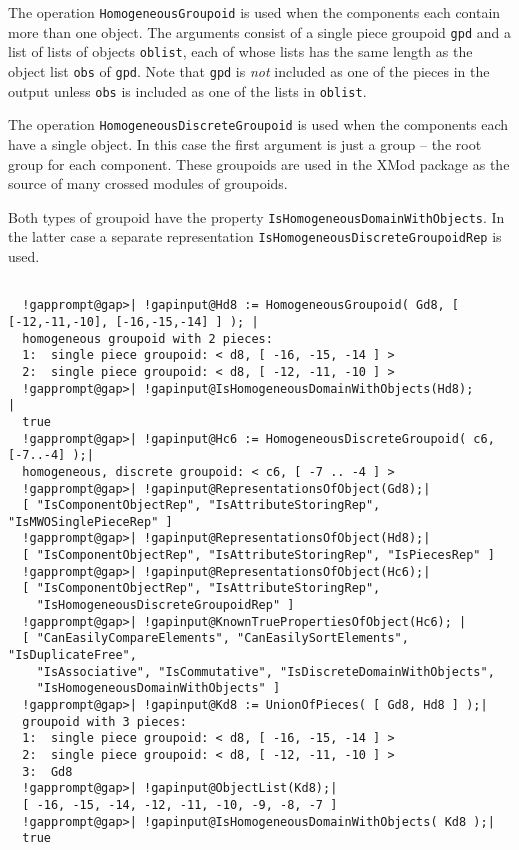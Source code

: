 \documentclass[a4paper,11pt]{report}
\begin{document}
{{{ The operation \texttt{HomogeneousGroupoid} is used when the components each contain more than one object. The arguments
consist of a single piece groupoid \texttt{gpd} and a list of lists of objects \texttt{oblist}, each of whose lists has the same length as the object list \texttt{obs} of \texttt{gpd}. Note that \texttt{gpd} is \emph{not} included as one of the pieces in the output unless \texttt{obs} is included as one of the lists in \texttt{oblist}. 

 The operation \texttt{HomogeneousDiscreteGroupoid} is used when the components each have a single object. In this case the first
argument is just a group -- the root group for each component. These groupoids
are used in the \textsf{XMod} package as the source of many crossed modules of groupoids. 

 Both types of groupoid have the property  \texttt{IsHomogeneousDomainWithObjects}. In the latter case a separate representation  \texttt{IsHomogeneousDiscreteGroupoidRep} is used. 

 }

 
\begin{Verbatim}[commandchars=!@|,fontsize=\small,frame=single,label=Example]
  
  !gapprompt@gap>| !gapinput@Hd8 := HomogeneousGroupoid( Gd8, [ [-12,-11,-10], [-16,-15,-14] ] ); |
  homogeneous groupoid with 2 pieces:
  1:  single piece groupoid: < d8, [ -16, -15, -14 ] >
  2:  single piece groupoid: < d8, [ -12, -11, -10 ] >
  !gapprompt@gap>| !gapinput@IsHomogeneousDomainWithObjects(Hd8);               |
  true
  !gapprompt@gap>| !gapinput@Hc6 := HomogeneousDiscreteGroupoid( c6, [-7..-4] );|
  homogeneous, discrete groupoid: < c6, [ -7 .. -4 ] >
  !gapprompt@gap>| !gapinput@RepresentationsOfObject(Gd8);|
  [ "IsComponentObjectRep", "IsAttributeStoringRep", "IsMWOSinglePieceRep" ]
  !gapprompt@gap>| !gapinput@RepresentationsOfObject(Hd8);|
  [ "IsComponentObjectRep", "IsAttributeStoringRep", "IsPiecesRep" ]
  !gapprompt@gap>| !gapinput@RepresentationsOfObject(Hc6);|
  [ "IsComponentObjectRep", "IsAttributeStoringRep", 
    "IsHomogeneousDiscreteGroupoidRep" ]
  !gapprompt@gap>| !gapinput@KnownTruePropertiesOfObject(Hc6); |
  [ "CanEasilyCompareElements", "CanEasilySortElements", "IsDuplicateFree", 
    "IsAssociative", "IsCommutative", "IsDiscreteDomainWithObjects", 
    "IsHomogeneousDomainWithObjects" ]
  !gapprompt@gap>| !gapinput@Kd8 := UnionOfPieces( [ Gd8, Hd8 ] );|
  groupoid with 3 pieces:
  1:  single piece groupoid: < d8, [ -16, -15, -14 ] >
  2:  single piece groupoid: < d8, [ -12, -11, -10 ] >
  3:  Gd8
  !gapprompt@gap>| !gapinput@ObjectList(Kd8);|
  [ -16, -15, -14, -12, -11, -10, -9, -8, -7 ]
  !gapprompt@gap>| !gapinput@IsHomogeneousDomainWithObjects( Kd8 );|
  true
  

\end{Verbatim}}}
\end{document}

